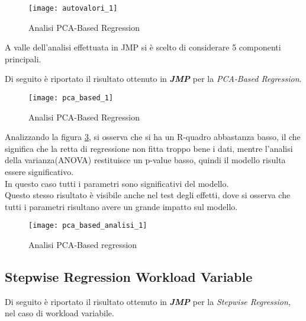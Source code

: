 \begin{figure}[!htbp]
  \centering
  \texttt{[image: autovalori\_1]}
  \caption{Analisi PCA-Based Regression}
  \label{and_autovalori_1}
\end{figure}

A valle dell'analisi effettuata in JMP si è scelto di considerare 5 componenti
principali.\\

\clearpage

Di seguito è riportato il risultato ottenuto in \textbf{\textit{JMP}} per
la \textit{PCA-Based Regression}.\\

\begin{figure}[!htbp]
  \centering
  \texttt{[image: pca\_based\_1]}
  \caption{Analisi PCA-Based Regression}
  \label{and_pca_based_1}
\end{figure}

\clearpage

Analizzando la figura \ref{and_pca_based_analisi_1}, si osserva che si ha un R-quadro
abbastanza basso, il che significa che la retta di regressione non fitta troppo
bene i dati, mentre l'analisi della varianza(ANOVA) restituisce un p-value basso,
quindi il modello risulta essere significativo.\\
In questo caso tutti i parametri sono significativi del modello.\\
Questo stesso risultato è visibile anche nel test degli effetti, dove si osserva
che tutti i parametri risultano avere un grande impatto sul modello.\\

\begin{figure}[!htbp]
  \centering
  \texttt{[image: pca\_based\_analisi\_1]}
  \caption{Analisi PCA-Based regression}
  \label{and_pca_based_analisi_1}
\end{figure}

\clearpage

\subsection{Stepwise Regression Workload Variable}

Di seguito è riportato il risultato ottenuto in \textbf{\textit{JMP}} per
la \textit{Stepwise Regression}, nel caso di workload variabile.\\

